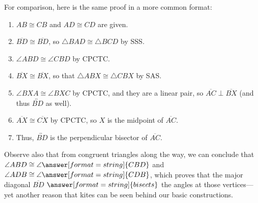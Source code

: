 \documentclass[nooutcomes]{ximera}
\begin{document}
\begin{problem}
\begin{problem}
For comparison, here is the same proof in a more common format:
\begin{enumerate}
\item $AB\cong CB$ and $AD\cong CD$ are given.  
\item $\overline{BD}\cong \overline{BD}$, so $\triangle BAD \cong \triangle BCD$ by SSS.  
\item $\angle ABD \cong \angle CBD$ by CPCTC. 
\item $\overline{BX}\cong \overline{BX}$, so that $\triangle ABX \cong \triangle CBX$ by SAS.  
\item $\angle BXA \cong \angle BXC$ by CPCTC, and they are a linear pair, 
so $\overline{AC}\perp\overline{BX}$ (and thus $\overleftrightarrow{BD}$ as well). 
\item $\overline{AX}\cong \overline{CX}$ by CPCTC, so $X$ is the midpoint of $\overline{AC}$.
\item Thus, $\overleftrightarrow{BD}$ is the perpendicular bisector of $\overline{AC}$.
\end{enumerate}

Observe also that from congruent triangles along the way, we can conclude that 
$\angle ABD\cong \angle \answer[format=string]{CBD}$ and $\angle ADB \cong \angle \answer[format=string]{CDB}$, 
which proves that the major diagonal $\overline{BD}$ $\answer[format=string]{bisects}$ the angles at those vertices---yet 
another reason that kites can be seen behind our basic constructions.  

\end{problem}

\end{problem}
\end{document}
